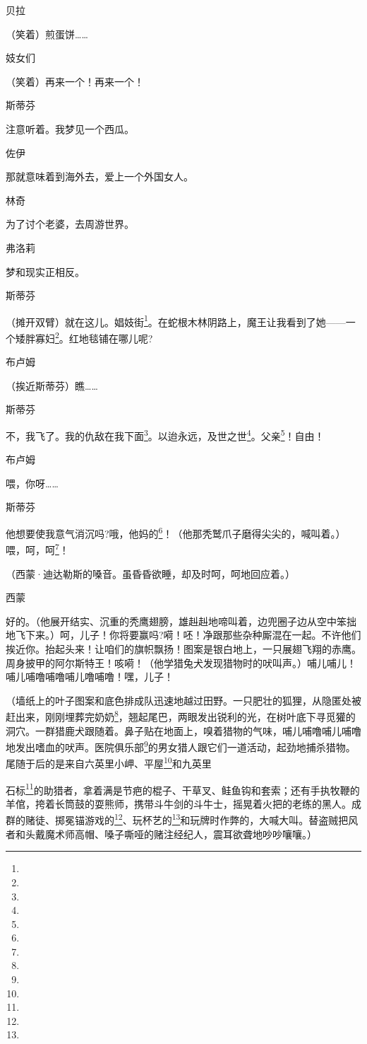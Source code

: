\par 贝拉
\par （笑着）煎蛋饼……
\par 妓女们
\par （笑着）再来一个！再来一个！
\par 斯蒂芬
\par 注意听着。我梦见一个西瓜。
\par 佐伊
\par 那就意味着到海外去，爱上一个外国女人。
\par 林奇
\par 为了讨个老婆，去周游世界。
\par 弗洛莉
\par 梦和现实正相反。
\par 斯蒂芬
\par （摊开双臂）就在这儿。娼妓街\footnote{}。在蛇根木林阴路上，魔王让我看到了她——一个矮胖寡妇\footnote{}。红地毯铺在哪儿呢?
\par 布卢姆
\par （挨近斯蒂芬）瞧……
\par 斯蒂芬
\par 不，我飞了。我的仇敌在我下面\footnote{}。以迨永远，及世之世\footnote{}。父亲\footnote{}！自由！
\par 布卢姆
\par 喂，你呀……
\par 斯蒂芬
\par 他想要使我意气消沉吗?哦，他妈的\footnote{}！（他那秃鹫爪子磨得尖尖的，喊叫着。）喂，呵，呵\footnote{}！
\par （西蒙·迪达勒斯的嗓音。虽昏昏欲睡，却及时呵，呵地回应着。）
\par 西蒙
\par 好的。（他展开结实、沉重的秃鹰翅膀，雄赳赳地啼叫着，边兜圈子边从空中笨拙地飞下来。）呵，儿子！你将要赢吗?嗬！呸！净跟那些杂种厮混在一起。不许他们挨近你。抬起头来！让咱们的旗帜飘扬！图案是银白地上，一只展翅飞翔的赤鹰。周身披甲的阿尔斯特王！咳嗬！（他学猎兔犬发现猎物时的吠叫声。）哺儿哺儿！哺儿哺噜哺噜哺儿噜哺噜！嘿，儿子！
\par （墙纸上的叶子图案和底色排成队迅速地越过田野。一只肥壮的狐狸，从隐匿处被赶出来，刚刚埋葬完奶奶\footnote{}，翘起尾巴，两眼发出锐利的光，在树叶底下寻觅獾的洞穴。一群猎鹿犬跟随着。鼻子贴在地面上，嗅着猎物的气味，哺儿哺噜哺儿哺噜地发出嗜血的吠声。医院俱乐部\footnote{}的男女猎人跟它们一道活动，起劲地捕杀猎物。尾随于后的是来自六英里小岬、平屋\footnote{}和九英里
\par 石标\footnote{}的助猎者，拿着满是节疤的棍子、干草叉、鲑鱼钩和套索；还有手执牧鞭的羊倌，挎着长筒鼓的耍熊师，携带斗牛剑的斗牛士，摇晃着火把的老练的黑人。成群的赌徒、掷冕锚游戏的\footnote{}、玩杯艺的\footnote{}和玩牌时作弊的，大喊大叫。替盗贼把风者和头戴魔术师高帽、嗓子嘶哑的赌注经纪人，震耳欲聋地吵吵嚷嚷。）
